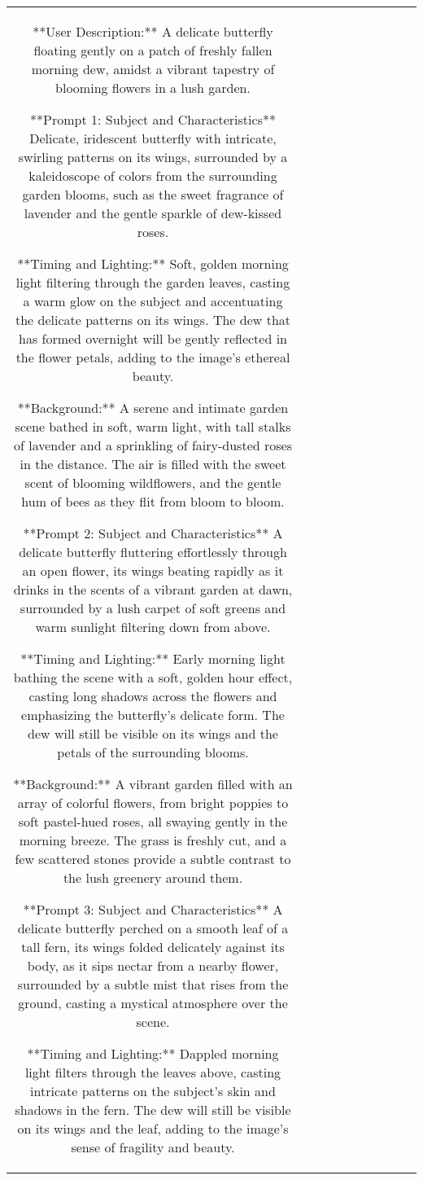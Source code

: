 \begin{table}[h!]
\begin{tabular}{|c|c|c|c|c|c|c|c|c|c|}
**User Description:** A delicate butterfly floating gently on a patch of freshly fallen morning dew, amidst a vibrant tapestry of blooming flowers in a lush garden.

**Prompt 1: Subject and Characteristics**
Delicate, iridescent butterfly with intricate, swirling patterns on its wings, surrounded by a kaleidoscope of colors from the surrounding garden blooms, such as the sweet fragrance of lavender and the gentle sparkle of dew-kissed roses.

**Timing and Lighting:** Soft, golden morning light filtering through the garden leaves, casting a warm glow on the subject and accentuating the delicate patterns on its wings. The dew that has formed overnight will be gently reflected in the flower petals, adding to the image's ethereal beauty.

**Background:**
A serene and intimate garden scene bathed in soft, warm light, with tall stalks of lavender and a sprinkling of fairy-dusted roses in the distance. The air is filled with the sweet scent of blooming wildflowers, and the gentle hum of bees as they flit from bloom to bloom.

**Prompt 2: Subject and Characteristics**
A delicate butterfly fluttering effortlessly through an open flower, its wings beating rapidly as it drinks in the scents of a vibrant garden at dawn, surrounded by a lush carpet of soft greens and warm sunlight filtering down from above.

**Timing and Lighting:** Early morning light bathing the scene with a soft, golden hour effect, casting long shadows across the flowers and emphasizing the butterfly's delicate form. The dew will still be visible on its wings and the petals of the surrounding blooms.

**Background:**
A vibrant garden filled with an array of colorful flowers, from bright poppies to soft pastel-hued roses, all swaying gently in the morning breeze. The grass is freshly cut, and a few scattered stones provide a subtle contrast to the lush greenery around them.

**Prompt 3: Subject and Characteristics**
A delicate butterfly perched on a smooth leaf of a tall fern, its wings folded delicately against its body, as it sips nectar from a nearby flower, surrounded by a subtle mist that rises from the ground, casting a mystical atmosphere over the scene.

**Timing and Lighting:** Dappled morning light filters through the leaves above, casting intricate patterns on the subject's skin and shadows in the fern. The dew will still be visible on its wings and the leaf, adding to the image's sense of fragility and beauty.


\end{tabular}
\end{table}
